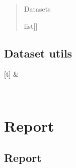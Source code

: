 \documentclass[letterpaper,10pt,english]{sphinxmanual}
\begin{document}
\begin{fulllineitems}
\begin{fulllineitems}
\begin{quote}
\begin{description}
\begin{itemize}
\end{itemize}

\sphinxAtStartPar
{} \textendash{} Datasets

\sphinxAtStartPar
list{[}{\hyperref[\detokenize{data/_autosummary/miml.data.miml_dataset.MIMLDataset:miml.data.miml_dataset.MIMLDataset}]{}}{]}

\end{description}\end{quote}

\end{fulllineitems}


\end{fulllineitems}


\sphinxstepscope


\section{Dataset utils}
\label{\detokenize{data/dataset_utils:dataset-utils}}\label{\detokenize{data/dataset_utils::doc}}

\begin{savenotes}\sphinxattablestart
\sphinxthistablewithglobalstyle
\sphinxthistablewithnovlinesstyle
\centering
\begin{tabulary}{\linewidth}[t]{}
\sphinxtoprule
\sphinxtableatstartofbodyhook
\sphinxAtStartPar
{}
&
\sphinxAtStartPar

\\
\sphinxbottomrule
\end{tabulary}
\sphinxtableafterendhook\par
\sphinxattableend\end{savenotes}

\sphinxstepscope


\chapter{Report}
\label{\detokenize{report/index:report}}\label{\detokenize{report/index::doc}}
\sphinxstepscope


\section{Report}
\label{\detokenize{report/report:report}}\label{\detokenize{report/report::doc}}
\end{document}
